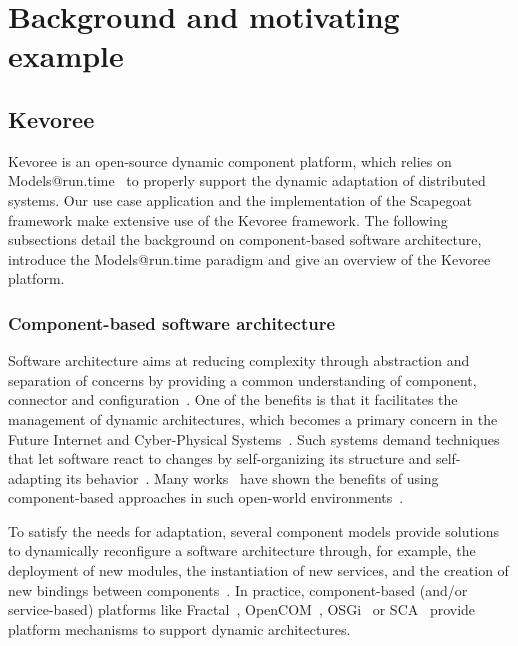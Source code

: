 \section{Background and motivating example}\label{sec:background}



\subsection{Kevoree}
Kevoree is an open-source dynamic component platform, which relies on Models@run.time~\cite{BlairBF09} to properly support the dynamic adaptation of distributed systems.
Our use case application and the implementation of the Scapegoat framework make extensive use of the Kevoree framework.
The following subsections detail the background on component-based software architecture, introduce the Models@run.time paradigm and give an overview of the Kevoree platform.

\subsubsection{Component-based software architecture}

Software architecture aims at reducing complexity through abstraction and separation of concerns by providing a common understanding of component, connector and configuration~\cite{xadl,Medvidovic:2000,VanOmmering-et-al-00}.
One of the benefits is that it facilitates the management of dynamic architectures, which becomes a primary concern in the Future Internet and Cyber-Physical Systems~\cite{DBLP:journals/ase/NittoGMPP08, Johnson:2015:CSM:2735960.2735979}.
Such systems demand techniques that let software react to changes by self-organizing its structure and self-adapting its behavior~\cite{PanzicaLaManna:2012:LDU:2304736.2304764, Johnson:2015:CSM:2735960.2735979, Zhang:2009:MVD:1509239.1509262}.
Many works~\cite{cbse-conference} have shown the benefits of using component-based approaches in such open-world environments~\cite{baresi2006toward, Caporuscio:2010:AIA:1985522.1985547, Perez-Palacin:2010:PAO:1712605.1712614}.

To satisfy the needs for adaptation, several component models provide solutions to dynamically reconfigure a software architecture through, for example, the deployment of new modules, the instantiation of new services, and the creation of new bindings between components~\cite{Porter:2014:RMC:2602458.2602471, Zheng:2014:RCC:2679601.2680405, Irmert:2008:RAS:1370018.1370036, Ghezzi:2010:QDD:2163764.2163774}. 
In practice, component-based (and/or service-based) platforms like Fractal~\cite{bruneton06}, OpenCOM~\cite{BlairCULJ04}, OSGi~\cite{OSGI:r5} or SCA~\cite{SEINTURIER:2011:INRIA-00567442:1} provide platform mechanisms to support dynamic architectures.

